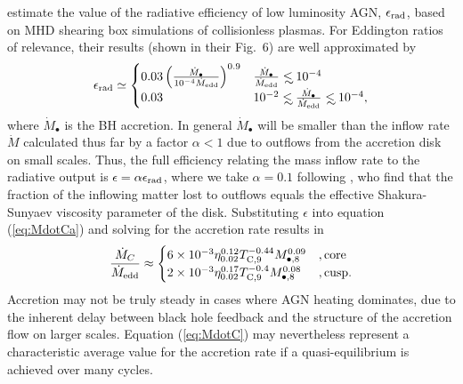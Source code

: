 \documentclass[usenatbib,fleqn]{mn2e}
\newcommand\lsim{\mathrel{\rlap{\lower4pt\hbox{\hskip1pt$\sim$}}
    \raise1pt\hbox{$<$}}}
\begin{document}
\citet{Sharma+2007} estimate the value of the radiative efficiency of low luminosity AGN, $\epsilon_{\rm rad}$,
based on MHD shearing box simulations of collisionless plasmas.  For Eddington ratios of relevance, their results (shown in their Fig.~6) are well approximated by
\begin{align}
\epsilon_{\rm rad} \simeq 
\begin{cases}
  0.03 \left(\frac{\dot{M}_{\bullet}}{10^{-4}\dot{M}_{\rm edd}}\right)^{0.9} & \frac{\dot{M}_{\bullet}}{\dot{M}_{\rm edd}} \lsim 10^{-4} \\
 0.03 &  10^{-2} \lsim \frac{\dot{M}_{\bullet}}{\dot{M}_{\rm edd}} \lsim  10^{-4},
\end{cases}
\label{eq:efficiency}
\end{align}
where $\dot{M}_{\bullet}$ is the BH accretion.  In general $\dot{M}_{\bullet}$ will be smaller than the inflow rate $\dot{M}$ calculated thus far by a factor $\alpha < 1$ due to outflows from the accretion disk on small scales.  Thus, the full efficiency relating the mass inflow rate to the radiative output is $\epsilon = \alpha \epsilon_{\rm rad}$, where we take $\alpha = 0.1$ following \citet{Li+2013}, who find that the fraction of the inflowing matter lost to outflows equals the effective Shakura-Sunyaev viscosity parameter of the disk.  Substituting $\epsilon$ into equation (\ref{eq:MdotCa}) and solving for the accretion rate results in
\begin{align}
\frac{\dot{M}_{C}}{\dot{M}_{\rm edd}} \approx 
\begin{cases} 6\times 10^{-3} \eta_{0.02}^{0.12}T_{\rm
C,9}^{-0.44}M_{\bullet,8}^{0.09}
&, \text{core}\\ 2\times 10^{-3} \eta_{0.02}^{0.17}T_{\rm
C,9}^{-0.4} M_{\bullet,8}^{0.08}
&, \text{cusp}.
  \end{cases}
  \label{eq:MdotC}
\end{align}
Accretion may not be truly steady in cases where AGN
heating dominates, due to the inherent delay between black hole
feedback and the structure of the accretion flow on larger scales.
Equation (\ref{eq:MdotC}) may nevertheless
represent a characteristic average value for the accretion rate if a quasi-equilibrium is achieved over many cycles.
\end{document}
